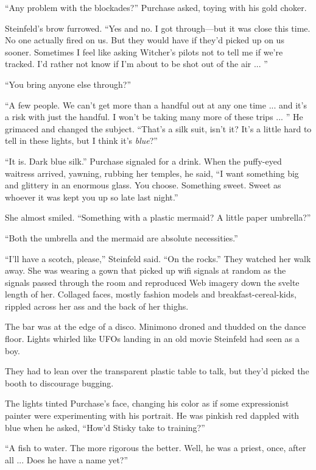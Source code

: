 ``Any problem with the blockades?'' Purchase asked, toying with his gold choker.

Steinfeld's brow furrowed. ``Yes and no. I got through---but it was close this time. No one actually fired on us. But they would have if they'd picked up on us sooner. Sometimes I feel like asking Witcher's pilots not to tell me if we're tracked. I'd rather not know if I'm about to be shot out of the air ... ''

``You bring anyone else through?''

``A few people. We can't get more than a handful out at any one time ... and it's a risk with just the handful. I won't be taking many more of these trips ... '' He grimaced and changed the subject. ``That's a silk suit, isn't it? It's a little hard to tell in these lights, but I think it's \textit{blue}?''

``It is. Dark blue silk.'' Purchase signaled for a drink. When the puffy-eyed waitress arrived, yawning, rubbing her temples, he said, ``I want something big and glittery in an enormous glass. You choose. Something sweet. Sweet as whoever it was kept you up so late last night.''

She almost smiled. ``Something with a plastic mermaid? A little paper umbrella?''

``Both the umbrella and the mermaid are absolute necessities.''

``I'll have a scotch, please,'' Steinfeld said. ``On the rocks.'' They watched her walk away. She was wearing a gown that picked up wifi signals at random as the signals passed through the room and reproduced Web imagery down the svelte length of her. Collaged faces, mostly fashion models and breakfast-cereal-kids, rippled across her ass and the back of her thighs.

The bar was at the edge of a disco. Minimono droned and thudded on the dance floor. Lights whirled like UFOs landing in an old movie Steinfeld had seen as a boy.

They had to lean over the transparent plastic table to talk, but they'd picked the booth to discourage bugging.

The lights tinted Purchase's face, changing his color as if some expressionist painter were experimenting with his portrait. He was pinkish red dappled with blue when he asked, ``How'd Stisky take to training?''

``A fish to water. The more rigorous the better. Well, he was a priest, once, after all ... Does he have a name yet?''

